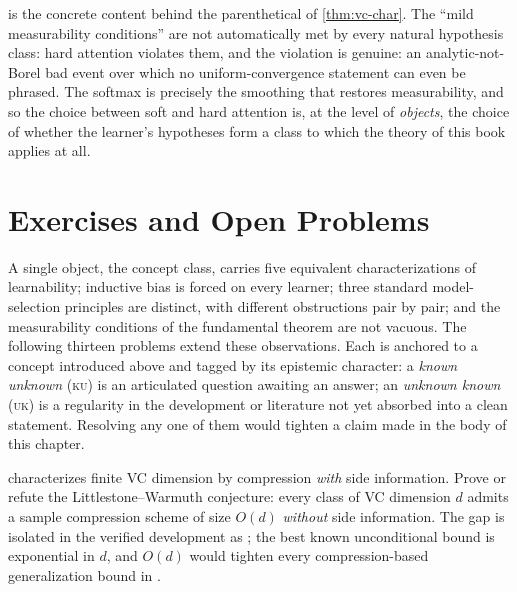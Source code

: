 \begin{remark}
\label{rmk:attention-measurability}
 is the concrete content behind the parenthetical of \cref{thm:vc-char}.  The ``mild measurability conditions'' are not automatically met by every natural hypothesis class: hard attention violates them, and the violation is genuine: an analytic-not-Borel bad event over which no uniform-convergence statement can even be phrased.  The softmax is precisely the smoothing that restores measurability, and so the choice between soft and hard attention is, at the level of \emph{objects}, the choice of whether the learner's hypotheses form a class to which the theory of this book applies at all.
\end{remark}

\section{Exercises and Open Problems}
\label{sec:ch1-open}

A single object, the concept class, carries five equivalent characterizations of learnability; inductive bias is forced on every learner; three standard model-selection principles are distinct, with different obstructions pair by pair; and the measurability conditions of the fundamental theorem are not vacuous. The following thirteen problems extend these observations. Each is anchored to a concept introduced above and tagged by its epistemic character: a \emph{known unknown} (\textsc{ku}) is an articulated question awaiting an answer; an \emph{unknown known} (\textsc{uk}) is a regularity in the development or literature not yet absorbed into a clean statement. Resolving any one of them would tighten a claim made in the body of this chapter.

\begin{openprob}
\label{op:compression-objects}
 characterizes finite VC dimension by compression \emph{with} side information. Prove or refute the Littlestone--Warmuth conjecture: every class of VC dimension $d$ admits a sample compression scheme of size $O(d)$ \emph{without} side information. The gap is isolated in the verified development as ; the best known unconditional bound is exponential in $d$, and $O(d)$ would tighten every compression-based generalization bound in .
\end{openprob}

